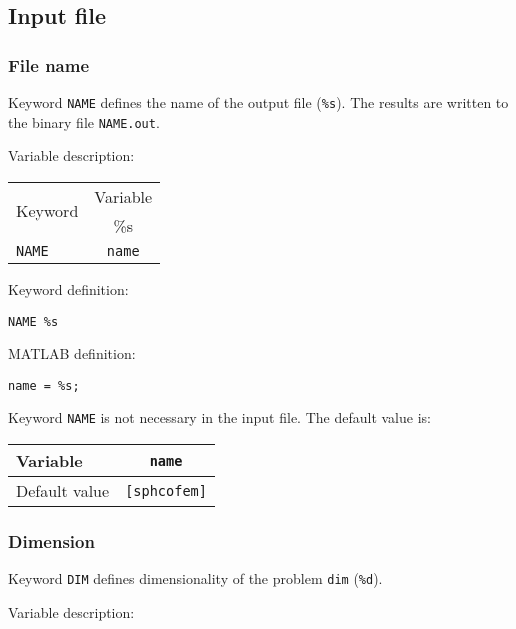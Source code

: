 \subsection{Input file}


\subsubsection{File name}

Keyword \texttt{NAME} defines the name of the output file (\texttt{\%s}). The results are written to the binary file \texttt{NAME.out}.

Variable description:

\begin{tabular}{|l|c|}
\hline
\multirow{2}{*}{Keyword} & Variable \\ \cline{2-2}
& \%s \\ \hline
\texttt{NAME} & \texttt{name} \\ \hline
\end{tabular}

Keyword definition:

\begin{tcolorbox}
\texttt{NAME \%s}
\end{tcolorbox}

MATLAB definition:

\begin{tcolorbox}
\texttt{name = \%s;}
\end{tcolorbox}

Keyword \texttt{NAME} is not necessary in the input file. The default value is:

\begin{tabular}{|l|c|}
\hline
Variable & \texttt{name} \\ \hline
Default value & \texttt{[sphcofem]} \\ \hline
\end{tabular}

\newpage


\subsubsection{Dimension}

Keyword \texttt{DIM} defines dimensionality of the problem \texttt{dim} (\texttt{\%d}).

Variable description:

